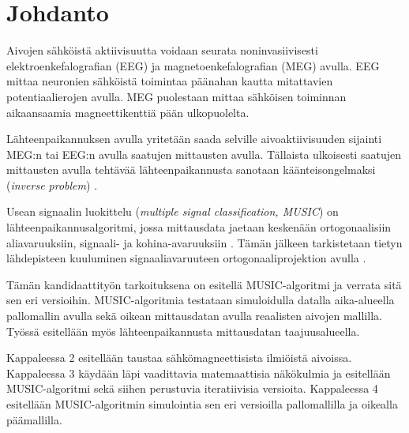 \section{Johdanto}

Aivojen sähköistä aktiivisuutta voidaan seurata noninvasiivisesti elektroenkefalografian (EEG) ja magnetoenkefalografian (MEG) avulla. EEG mittaa neuronien sähköistä toimintaa päänahan kautta mitattavien potentiaalierojen avulla. MEG puolestaan mittaa sähköisen toiminnan aikaansaamia magneettikenttiä pään ulkopuolelta. \citep{Hamalainen1993MagnetoencephalographytheoryBrain}

Lähteenpaikannuksen avulla yritetään saada selville aivoaktiivisuuden sijainti MEG:n tai EEG:n avulla saatujen mittausten avulla. Tällaista ulkoisesti saatujen mittausten avulla tehtävää lähteenpaikannusta sanotaan käänteisongelmaksi (\textit{inverse problem}) \citep[s. 2]{hansen2010meg}.

Usean signaalin luokittelu (\textit{multiple signal classification, MUSIC}) on lähteenpaikannusalgoritmi, jossa mittausdata jaetaan keskenään ortogonaalisiin aliavaruuksiin, signaali- ja kohina-avaruuksiin \citep{Schmidt1986MultipleEstimation}. Tämän jälkeen tarkistetaan tietyn lähdepisteen kuuluminen signaaliavaruuteen ortogonaaliprojektion avulla \citep{Mosher1999SourceMUSIC}.

Tämän kandidaattityön tarkoituksena on esitellä MUSIC-algoritmi ja verrata sitä sen eri versioihin. MUSIC-algoritmia testataan simuloidulla datalla aika-alueella pallomallin avulla sekä oikean mittausdatan avulla reaalisten aivojen mallilla. Työssä esitellään myös lähteenpaikannusta mittausdatan taajuusalueella.

Kappaleessa 2 esitellään taustaa sähkömagneettisista ilmiöistä aivoissa. Kappaleessa 3 käydään läpi vaadittavia matemaattisia näkökulmia ja esitellään MUSIC-algoritmi sekä siihen perustuvia iteratiivisia versioita. Kappaleessa 4 esitellään MUSIC-algoritmin simulointia sen eri versioilla pallomallilla ja oikealla päämallilla.